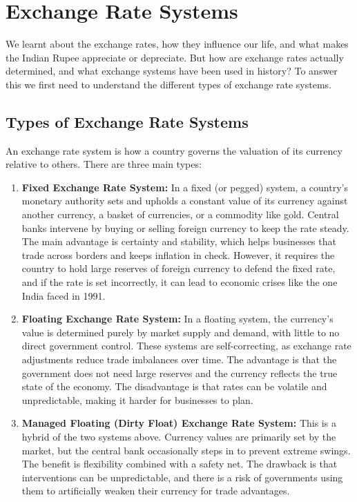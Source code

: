 \documentclass[12pt,a4paper]{article}
\begin{document}

\section*{Exchange Rate Systems}

We learnt about the exchange rates, how they influence our life, and what makes the Indian Rupee appreciate or depreciate. But how are exchange rates actually determined, and what exchange systems have been used in history? To answer this we first need to understand the different types of exchange rate systems.

\subsection*{Types of Exchange Rate Systems}

An exchange rate system is how a country governs the valuation of its currency relative to others. There are three main types:

\begin{enumerate}[leftmargin=*, label=\arabic*.]

\item \textbf{Fixed Exchange Rate System:} In a fixed (or pegged) system, a country's monetary authority sets and upholds a constant value of its currency against another currency, a basket of currencies, or a commodity like gold. Central banks intervene by buying or selling foreign currency to keep the rate steady. The main advantage is certainty and stability, which helps businesses that trade across borders and keeps inflation in check. However, it requires the country to hold large reserves of foreign currency to defend the fixed rate, and if the rate is set incorrectly, it can lead to economic crises like the one India faced in 1991.

\item \textbf{Floating Exchange Rate System:} In a floating system, the currency's value is determined purely by market supply and demand, with little to no direct government control. These systems are self-correcting, as exchange rate adjustments reduce trade imbalances over time. The advantage is that the government does not need large reserves and the currency reflects the true state of the economy. The disadvantage is that rates can be volatile and unpredictable, making it harder for businesses to plan.

\item \textbf{Managed Floating (Dirty Float) Exchange Rate System:} This is a hybrid of the two systems above. Currency values are primarily set by the market, but the central bank occasionally steps in to prevent extreme swings. The benefit is flexibility combined with a safety net. The drawback is that interventions can be unpredictable, and there is a risk of governments using them to artificially weaken their currency for trade advantages.

\end{enumerate}
\end{document}
